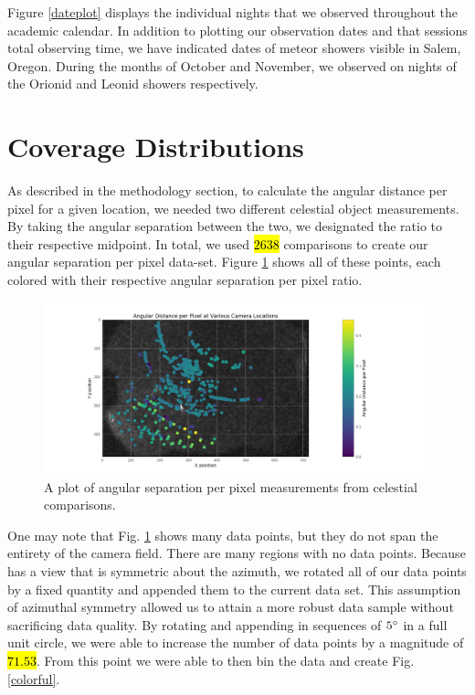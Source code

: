 Figure \ref{dateplot} displays the individual nights that we observed throughout the academic calendar. 
In addition to plotting our observation dates and that sessions total observing time, we have indicated dates of meteor showers visible in Salem, Oregon.  
During the months of October and November, we observed on nights of the Orionid and Leonid showers respectively.  




\section{Coverage Distributions}

As described in the methodology section, to calculate the angular distance per pixel for a given location, we needed two different celestial object measurements.
By taking the angular separation between the two, we designated the ratio to their respective midpoint.  
In total, we used \hl{$2638$} comparisons to create our angular separation per pixel data-set.  
Figure \ref{angperpix1} shows all of these points, each colored with their respective angular separation per pixel ratio.  

\begin{figure}[ht!]
  \centering
  \includegraphics[scale=0.4]{images/angular_distance_at_various_locations.png}
  \caption{A plot of angular separation per pixel measurements from celestial comparisons.}
  \label{angperpix1}
\end{figure}

One may note that Fig. \ref{angperpix1} shows many data points, but they do not span the entirety of the camera field. 
There are many regions with no data points.
Because has a view that is symmetric about the azimuth, we rotated all of our data points by a fixed quantity and appended them to the current data set.  
This assumption of azimuthal symmetry allowed us to attain a more robust data sample without sacrificing data quality.
By rotating and appending in sequences of $5\degree$ in a full unit circle, we were able to increase the number of data points by a magnitude of \hl{$71.53$}.
From this point we were able to then bin the data and create Fig. \ref{colorful}.


